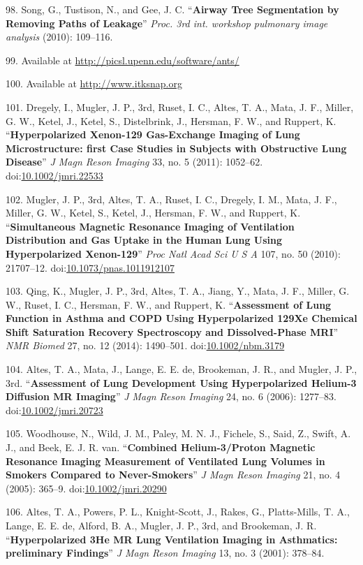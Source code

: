 \documentclass[11pt,]{article}
\begin{document}
98. Song, G., Tustison, N., and Gee, J. C. ``\textbf{Airway Tree
Segmentation by Removing Paths of Leakage}'' \emph{Proc. 3rd int.
workshop pulmonary image analysis} (2010): 109--116.

99. Available at \url{http://picsl.upenn.edu/software/ants/}

100. Available at \url{http://www.itksnap.org}

101. Dregely, I., Mugler, J. P., 3rd, Ruset, I. C., Altes, T. A., Mata,
J. F., Miller, G. W., Ketel, J., Ketel, S., Distelbrink, J., Hersman, F.
W., and Ruppert, K. ``\textbf{Hyperpolarized Xenon-129 Gas-Exchange
Imaging of Lung Microstructure: first Case Studies in Subjects with
Obstructive Lung Disease}'' \emph{J Magn Reson Imaging} 33, no. 5
(2011): 1052--62.
doi:\href{http://dx.doi.org/10.1002/jmri.22533}{10.1002/jmri.22533}

102. Mugler, J. P., 3rd, Altes, T. A., Ruset, I. C., Dregely, I. M.,
Mata, J. F., Miller, G. W., Ketel, S., Ketel, J., Hersman, F. W., and
Ruppert, K. ``\textbf{Simultaneous Magnetic Resonance Imaging of
Ventilation Distribution and Gas Uptake in the Human Lung Using
Hyperpolarized Xenon-129}'' \emph{Proc Natl Acad Sci U S A} 107, no. 50
(2010): 21707--12.
doi:\href{http://dx.doi.org/10.1073/pnas.1011912107}{10.1073/pnas.1011912107}

103. Qing, K., Mugler, J. P., 3rd, Altes, T. A., Jiang, Y., Mata, J. F.,
Miller, G. W., Ruset, I. C., Hersman, F. W., and Ruppert, K.
``\textbf{Assessment of Lung Function in Asthma and COPD Using
Hyperpolarized 129Xe Chemical Shift Saturation Recovery Spectroscopy and
Dissolved-Phase MRI}'' \emph{NMR Biomed} 27, no. 12 (2014): 1490--501.
doi:\href{http://dx.doi.org/10.1002/nbm.3179}{10.1002/nbm.3179}

104. Altes, T. A., Mata, J., Lange, E. E. de, Brookeman, J. R., and
Mugler, J. P., 3rd. ``\textbf{Assessment of Lung Development Using
Hyperpolarized Helium-3 Diffusion MR Imaging}'' \emph{J Magn Reson
Imaging} 24, no. 6 (2006): 1277--83.
doi:\href{http://dx.doi.org/10.1002/jmri.20723}{10.1002/jmri.20723}

105. Woodhouse, N., Wild, J. M., Paley, M. N. J., Fichele, S., Said, Z.,
Swift, A. J., and Beek, E. J. R. van. ``\textbf{Combined Helium-3/Proton
Magnetic Resonance Imaging Measurement of Ventilated Lung Volumes in
Smokers Compared to Never-Smokers}'' \emph{J Magn Reson Imaging} 21, no.
4 (2005): 365--9.
doi:\href{http://dx.doi.org/10.1002/jmri.20290}{10.1002/jmri.20290}

106. Altes, T. A., Powers, P. L., Knight-Scott, J., Rakes, G.,
Platts-Mills, T. A., Lange, E. E. de, Alford, B. A., Mugler, J. P., 3rd,
and Brookeman, J. R. ``\textbf{Hyperpolarized 3He MR Lung Ventilation
Imaging in Asthmatics: preliminary Findings}'' \emph{J Magn Reson
Imaging} 13, no. 3 (2001): 378--84.
\end{document}

